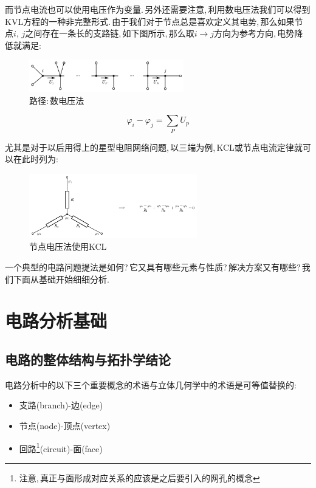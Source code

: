 而节点电流也可以使用电压作为变量.\,另外还需要注意,\,利用数电压法我们可以得到KVL方程的一种非完整形式.\,由于我们对于节点总是喜欢定义其电势,\,那么如果节点$i,\,j$之间存在一条长的支路链,\,如下图所示,\,那么取$i\to j$方向为参考方向,\,电势降低就满足:

\begin{figure}[H]
\centering
\includegraphics[width=0.6\textwidth]{image/7-3-13.png}
\caption{路径:\,数电压法}
\end{figure}

\vspace{-1cm}

\[\varphi_i-\varphi_j=\sum_P U_p\]

尤其是对于以后用得上的星型电阻网络问题,\,以三端为例,\,KCL或节点电流定律就可以在此时列为:
\begin{figure}[H]
\centering
\includegraphics[width=0.65\textwidth]{image/7-3-14.png}
\caption{节点电压法使用KCL}
\end{figure}

一个典型的电路问题提法是如何?\,它又具有哪些元素与性质?\,解决方案又有哪些?\,我们下面从基础开始细细分析.


\section{电路分析基础}

\subsection{电路的整体结构与拓扑学结论}

电路分析中的以下三个重要概念的术语与立体几何学中的术语是可等值替换的:
\begin{itemize}
	\item 支路(branch)-边(edge)
	\item 节点(node)-顶点(vertex)
	\item 回路\footnote{注意,\,真正与面形成对应关系的应该是之后要引入的网孔的概念}(circuit)-面(face)
\end{itemize}

